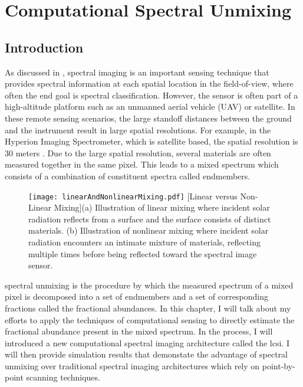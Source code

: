\chapter{Computational Spectral Unmixing}\label{chap:Csu}

\section{Introduction}

As discussed in , spectral imaging is an important sensing technique that provides spectral information at each spatial location in the field-of-view, where often the end goal is spectral classification. However, the sensor is often part of a high-altitude platform such as an unmanned aerial vehicle (UAV) or satellite. In these remote sensing scenarios, the large standoff distances between the ground and the instrument result in large spatial resolutions. For example, in the Hyperion Imaging Spectrometer, which is satellite based, the spatial resolution is 30 meters \cite{folkman2001eo}. Due to the large spatial resolution, several materials are often measured together in the same pixel. This leads to a \gls{mixed spectrum} which consists of a combination of constituent spectra called \glspl{endmember}.

\begin{figure}[H]
	\centering
	\texttt{[image: linearAndNonlinearMixing.pdf]}
	[Linear versus Non-Linear Mixing]{(a) Illustration of linear mixing where incident solar radiation reflects from a surface and the surface consists of distinct materials. (b) Illustration of nonlinear mixing where incident solar radiation encounters an intimate mixture of materials, reflecting multiple times before being reflected toward the spectral image sensor.}
	\label{fig:linearAndNonlinearMixing}
\end{figure}

\Gls{spectral unmixing} is the procedure by which the measured spectrum of a mixed pixel is decomposed into a set of \glspl{endmember} and a set of corresponding fractions called the \glspl{fractional abundance}. In this chapter, I will talk about my efforts to apply the techniques of computational sensing to directly estimate the \gls{fractional abundance} present in the \gls{mixed spectrum}. In the process, I will introduced a new computational spectral imaging architecture called the \gls{lcsi}. I will then provide simulation results that demonstate the advantage of spectral unmixing over traditional spectral imaging architectures which rely on point-by-point scanning techniques.

